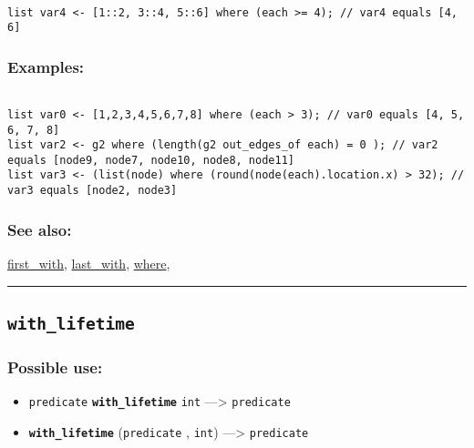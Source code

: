 \documentclass[]{book}
\providecommand{\tightlist}{%
  \setlength{\itemsep}{0pt}\setlength{\parskip}{0pt}}
\theoremstyle{definition}
\theoremstyle{definition}
\theoremstyle{definition}
\theoremstyle{remark}
\begin{document}
\begin{verbatim}
 
list var4 <- [1::2, 3::4, 5::6] where (each >= 4); // var4 equals [4, 6]
\end{verbatim}

\subsubsection{Examples:}\label{examples-382}

\begin{verbatim}
 
list var0 <- [1,2,3,4,5,6,7,8] where (each > 3); // var0 equals [4, 5, 6, 7, 8]  
list var2 <- g2 where (length(g2 out_edges_of each) = 0 ); // var2 equals [node9, node7, node10, node8, node11] 
list var3 <- (list(node) where (round(node(each).location.x) > 32); // var3 equals [node2, node3]
\end{verbatim}

\subsubsection{See also:}\label{see-also-220}

\href{OperatorsDH\#first_with}{first\_with},
\href{OperatorsIM\#last_with}{last\_with},
\href{OperatorsSZ\#where}{where},

\begin{center}\rule{0.5\linewidth}{\linethickness}\end{center}

\subsection{\texorpdfstring{\texttt{with\_lifetime}}{with\_lifetime}}\label{with_lifetime}

\subsubsection{Possible use:}\label{possible-use-556}

\begin{itemize}
\tightlist
\item
  \texttt{predicate} \textbf{\texttt{with\_lifetime}} \texttt{int}
  ---\textgreater{} \texttt{predicate}
\item
  \textbf{\texttt{with\_lifetime}} (\texttt{predicate} , \texttt{int})
  ---\textgreater{} \texttt{predicate}
\end{itemize}
\end{document}
